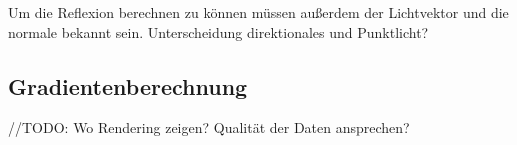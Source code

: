 Um die Reflexion berechnen zu können müssen außerdem der Lichtvektor und die normale bekannt sein.
Unterscheidung direktionales und Punktlicht?

\subsection{Gradientenberechnung}
\label{gradienten}


//TODO:
Wo Rendering zeigen? Qualität der Daten ansprechen?